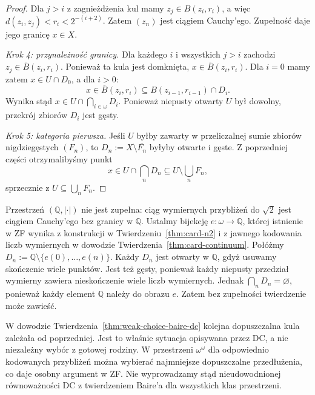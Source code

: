 \begin{proof}
Dla $j>i$ z zagnieżdżenia kul mamy
$z_j\in B(z_i,r_i)$, a więc
$d(z_i,z_j)<r_i<2^{-(i+2)}$.
Zatem $(z_n)$ jest ciągiem Cauchy'ego.
Zupełność daje jego granicę $x\in X$.

\emph{Krok 4: przynależność granicy.}
Dla każdego $i$ i wszystkich $j>i$ zachodzi
$z_j\in\overline B(z_i,r_i)$.
Ponieważ ta kula jest domknięta,
$x\in\overline B(z_i,r_i)$.
Dla $i=0$ mamy zatem $x\in U\cap D_0$,
a dla $i>0$:
\[
x\in\overline B(z_i,r_i)
 \subseteq B(z_{i-1},r_{i-1})\cap D_i.
\]
Wynika stąd
$x\in U\cap\bigcap_{i\in\omega}D_i$.
Ponieważ niepusty otwarty $U$
był dowolny, przekrój zbiorów $D_i$
jest gęsty.

\emph{Krok 5: kategoria pierwsza.}
Jeśli $U$ byłby zawarty w przeliczalnej
sumie zbiorów nigdziegęstych $(F_n)$,
to $D_n:=X\setminus\overline{F_n}$
byłyby otwarte i gęste.
Z poprzedniej części otrzymalibyśmy punkt
\[
x\in U\cap\bigcap_nD_n
\subseteq U\setminus\bigcup_nF_n,
\]
sprzecznie z $U\subseteq\bigcup_nF_n$.
\end{proof}

\begin{przyklad}
\label{ex:weak-choice-baire-noncomplete}
Przestrzeń $(\mathbb Q,|\cdot|)$ nie jest zupełna:
ciąg wymiernych przybliżeń do $\sqrt2$ jest
ciągiem Cauchy'ego bez granicy w $\mathbb Q$.
Ustalmy bijekcję $e:\omega\to\mathbb Q$,
której istnienie w ZF wynika z konstrukcji
w Twierdzeniu~\ref{thm:card-n2}
i z jawnego kodowania liczb wymiernych
w dowodzie Twierdzenia~\ref{thm:card-continuum}.
Połóżmy
$D_n:=\mathbb Q\setminus
\{e(0),\ldots,e(n)\}$.
Każdy $D_n$ jest otwarty w $\mathbb Q$,
gdyż usuwamy skończenie wiele punktów.
Jest też gęsty, ponieważ
każdy niepusty przedział wymierny zawiera
nieskończenie wiele liczb wymiernych.
Jednak $\bigcap_nD_n=\varnothing$,
ponieważ każdy element $\mathbb Q$
należy do obrazu $e$.
Zatem bez zupełności twierdzenie może zawieść.
\end{przyklad}

\begin{uwaga}
\label{rem:weak-choice-baire-dc}
W dowodzie Twierdzenia~\ref{thm:weak-choice-baire-dc}
kolejna dopuszczalna kula zależała od poprzedniej.
Jest to właśnie sytuacja opisywana przez DC,
a nie niezależny wybór z gotowej rodziny.
W przestrzeni $\omega^\omega$
dla odpowiednio kodowanych przybliżeń
można wybierać najmniejsze dopuszczalne
przedłużenia, co daje osobny argument w ZF.
Nie wyprowadzamy stąd nieudowodnionej
równoważności DC z twierdzeniem Baire'a
dla wszystkich klas przestrzeni.
\end{uwaga}

